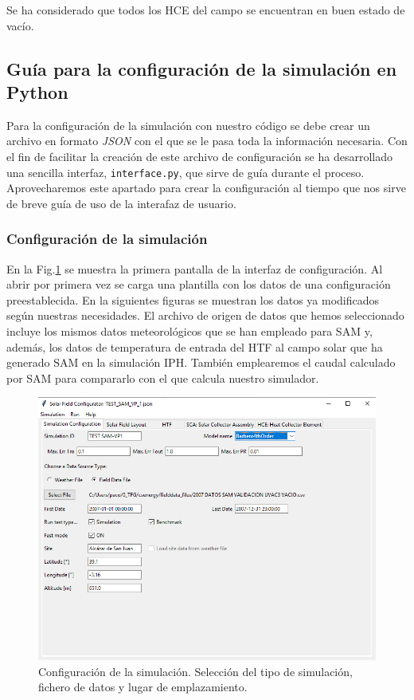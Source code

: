 Se ha considerado que todos los HCE  del campo se encuentran en buen estado de vacío.

\subsection{Guía para la configuración de la simulación en Python}

Para la configuración de la simulación con nuestro código se debe crear un archivo en formato \emph{JSON} con el que se le pasa toda la información necesaria. Con el fin de facilitar la creación de este archivo de configuración se ha desarrollado una sencilla interfaz, \texttt{interface.py}, que sirve de guía durante el proceso. Aprovecharemos este apartado para crear la configuración al tiempo que nos sirve de breve guía de uso de la interafaz de usuario.

\subsubsection{Configuración de la simulación}
En la Fig.\ref{fig:interface01} se muestra la primera pantalla de la interfaz de configuración. Al abrir por primera vez se carga una plantilla con los datos de una configuración preestablecida. En la siguientes figuras se muestran los datos ya modificados según nuestras necesidades. El archivo de origen de datos que hemos seleccionado incluye los mismos datos meteorológicos que se han empleado para SAM y, además, los datos de temperatura de entrada del HTF al campo solar que ha generado SAM en la simulación IPH. También emplearemos el caudal calculado por SAM para compararlo con el que calcula nuestro simulador.

\begin{figure}[H]
\includegraphics[width=0.9\linewidth]{images/interface01.png}
\caption[Configuración del tipo de simulación]{Configuración de la simulación. Selección del tipo de simulación, fichero de datos y lugar de emplazamiento.} 
\label{fig:interface01}
\end{figure}

